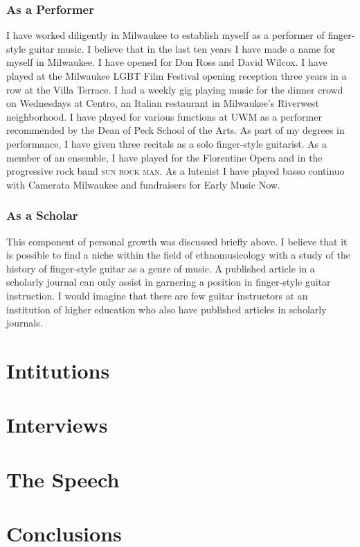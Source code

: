 \documentclass[12pt]{article}
\begin{document}
\subsubsection{As a Performer}
\label{sec:performer}
I have worked diligently in Milwaukee to establish myself as a
performer of finger-style guitar music. I believe that in the last ten
years I have made a name for myself in Milwaukee. I have opened for
Don Ross and David Wilcox. I have played at the Milwaukee LGBT Film
Festival opening reception three years in a row at the Villa
Terrace. I had a weekly gig playing music for the dinner crowd on
Wednesdays at Centro, an Italian restaurant in Milwaukee's Riverwest
neighborhood. I have played for various functions at UWM as a
performer recommended by the Dean of Peck School of the Arts. As part
of my degrees in performance, I have given three recitals as a solo
finger-style guitarist. As a member of an ensemble, I have played for
the Florentine Opera and in the progressive rock band \textsc{sun rock
  man}. As a lutenist I have played basso continuo with Camerata
Milwaukee and fundraisers for Early Music Now.
\subsubsection{As a Scholar}
\label{sec:scholar}
This component of personal growth was discussed briefly above. I
believe that it is possible to find a niche within the field of
ethnomusicology with a study of the history of finger-style guitar as
a genre of music. A published article in a scholarly journal can only
assist in garnering a position in finger-style guitar instruction. I
would imagine that there are few guitar instructors at an institution
of higher education who also have published articles in scholarly
journals. 
\section{Intitutions}
\label{sec:intitutions}

\section{Interviews}
\label{sec:interviews}

\section{The Speech}
\label{sec:speech}

\section{Conclusions}
\label{sec:conclusions}

\clearpage
\printbibliography
\end{document}
